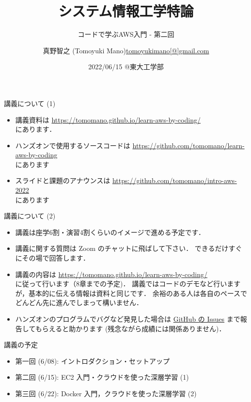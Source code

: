 \documentclass[unicode,11pt]{beamer}
\title{システム情報工学特論}
\subtitle{コードで学ぶAWS入門 - 第二回}
\author{\texorpdfstring{真野智之 (Tomoyuki Mano)\newline\url{tomoyukimano[@]gmail.com}}{Author}}
\institute[OIST]{Okinawa Institute of Science and Technology (OIST)}
\date{2022/06/15 @東大工学部}
\begin{document}
\frame{\titlepage}

\begin{frame}{講義について (1)}
\begin{itemize}
    \item 講義資料は
    \url{https://tomomano.github.io/learn-aws-by-coding/}\\
    にあります．
    \item ハンズオンで使用するソースコードは \url{https://github.com/tomomano/learn-aws-by-coding}\\
    にあります
    \item スライドと課題のアナウンスは
    \url{https://github.com/tomomano/intro-aws-2022}\\
    にあります
\end{itemize}
\end{frame}

\begin{frame}{講義について (2)}
\begin{itemize}
    \item 講義は座学6割・演習4割くらいのイメージで進める予定です．
    \item 講義に関する質問は Zoom のチャットに飛ばして下さい．
    できるだけすぐにその場で回答します．
    \item 講義の内容は
    \url{https://tomomano.github.io/learn-aws-by-coding/}\\
    に従って行います（8章までの予定)．
    講義ではコードのデモなど行いますが，基本的に伝える情報は資料と同じです．
    余裕のある人は各自のペースでどんどん先に進んでしまって構いません．
    \item ハンズオンのプログラムでバグなど発見した場合は
    \href{https://github.com/tomomano/learn-aws-by-coding/issues}{GitHub の Issues}
    まで報告してもらえると助かります (残念ながら成績には関係ありません)．
\end{itemize}

\end{frame}

\begin{frame}{講義の予定}
    \begin{itemize}
        \item 第一回 (6/08): イントロダクション・セットアップ
        \item 第二回 (6/15): EC2 入門・クラウドを使った深層学習 (1)
        \item 第三回 (6/22): Docker 入門，クラウドを使った深層学習 (2)
    \end{itemize}
\end{frame}
\end{document}
